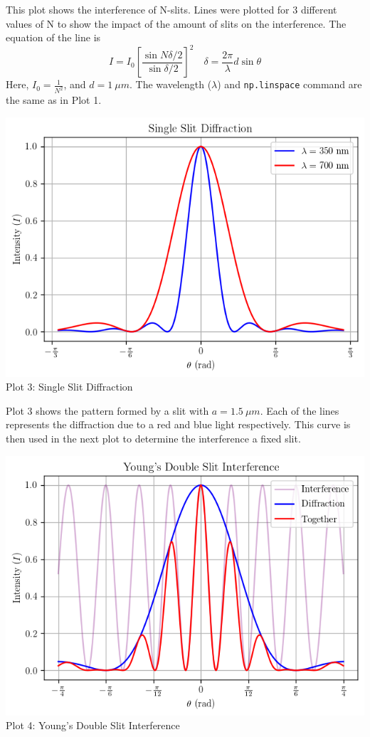 \documentclass[12pt]{article}
\begin{document}
This plot shows the interference of N-slits. Lines were plotted for 3 different values of N to show the impact of the amount of slits on the interference.
The equation of the line is \[I=I_0 \left[\frac{\sin N\delta/2}{\sin\delta/2}\right]^2 \quad \delta=\frac{2\pi}{\lambda}d\sin\theta\]
Here, $I_0=\frac{1}{N^2}$, and $d = 1\: \mu m$. The wavelength ($\lambda$) and \verb+np.linspace+ command are the same as in Plot 1. 
\begin{center}
    \includegraphics*[]{ssd.png}\\
    Plot 3: Single Slit Diffraction\\
\end{center}
Plot 3 shows the pattern formed by a slit with $a=1.5\:\mu m$. Each of the lines represents the diffraction due to a red and blue light respectively.
This curve is then used in the next plot to determine the interference a fixed slit.
\newpage
\begin{center}
    \includegraphics*[]{ydsi.png}\\
    Plot 4: Young's Double Slit Interference\\ 
\end{center}
\end{document}
